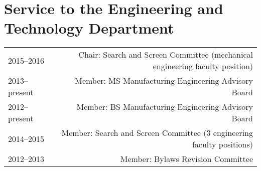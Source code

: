\section*{Service to the Engineering and Technology Department}
\begin{tabular}{L!{\VRule}R}
2015--2016&Chair: Search and Screen Committee (mechanical engineering faculty position)\\
2013--present&Member: MS Manufacturing Engineering Advisory Board\\
2012--present&Member: BS Manufacturing Engineering Advisory Board\\
2014--2015&Member: Search and Screen Committee (3 engineering faculty positions)\\
2012--2013&Member: Bylaws Revision Committee\\
\end{tabular}